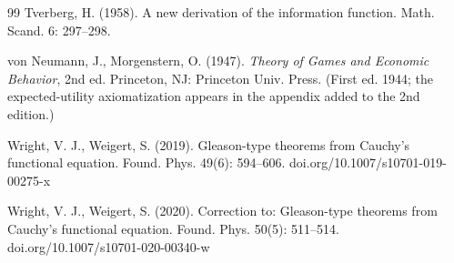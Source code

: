 \documentclass{article}
\theoremstyle{plain}
\theoremstyle{definition}
\begin{document}
\begin{thebibliography}{99}
Tverberg, H. (1958). A new derivation of the information function. Math.
Scand. 6: 297--298.

von Neumann, J., Morgenstern, O. (1947). \emph{Theory of Games and Economic
Behavior}, 2nd ed. Princeton, NJ: Princeton Univ. Press. (First ed. 1944; the
expected-utility axiomatization appears in the appendix added to the 2nd
edition.)

Wright, V. J., Weigert, S. (2019). Gleason-type theorems from Cauchy's
functional equation. Found. Phys. 49(6): 594--606.
doi.org/10.1007/s10701-019-00275-x

Wright, V. J., Weigert, S. (2020). Correction to: Gleason-type theorems from
Cauchy's functional equation. Found. Phys. 50(5): 511--514.
doi.org/10.1007/s10701-020-00340-w

\end{thebibliography}
\end{document}
